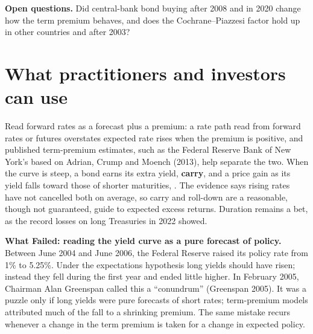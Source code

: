 \label{sec:07-open}
\textbf{Open questions.} Did central-bank bond buying after 2008 and in 2020 change how the term premium behaves, and does the Cochrane--Piazzesi factor hold up in other countries and after 2003?

\section{What practitioners and investors can use}
\label{sec:07-investors}

Read forward rates as a forecast plus a premium: a rate path read from forward rates or futures overstates expected rate rises when the premium is positive, and published term-premium estimates, such as the Federal Reserve Bank of New York's based on Adrian, Crump and Moench (2013), help separate the two. When the curve is steep, a bond earns its extra yield, \textbf{carry}, and a price gain as its yield falls toward those of shorter maturities, . The evidence says rising rates have not cancelled both on average, so carry and roll-down are a reasonable, though not guaranteed, guide to expected excess returns. Duration remains a bet, as the record losses on long Treasuries in 2022 showed.

\begin{callout}
\textbf{What Failed: reading the yield curve as a pure forecast of policy.} Between June 2004 and June 2006, the Federal Reserve raised its policy rate from 1\% to 5.25\%. Under the expectations hypothesis long yields should have risen; instead they fell during the first year and ended little higher. In February 2005, Chairman Alan Greenspan called this a ``conundrum'' (Greenspan 2005). It was a puzzle only if long yields were pure forecasts of short rates; term-premium models attributed much of the fall to a shrinking premium. The same mistake recurs whenever a change in the term premium is taken for a change in expected policy.
\end{callout}

\makeatletter
{}
\makeatother


